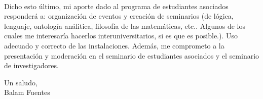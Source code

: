 \documentclass{article}
\begin{document}
\vspace{5pt} \\ 
Dicho esto último, mi aporte dado al programa de estudiantes
asociados responderá a: organización de eventos y creación de seminarios 
(de lógica, lenguaje, ontología análitica, filosofía de las matemáticas, 
etc.. Algunos de los cuales me interesaría hacerlos interuniversitarios, si 
es que es posible.). Uso adecuado y correcto de las instalaciones. Además, 
me comprometo a la presentación y moderación en el seminario de estudiantes 
asociados y el seminario de investigadores.
\vspace{5pt} \\ 
\begin{flushright}
    Un saludo, \\
    Balam Fuentes
\end{flushright}
\end{document}
